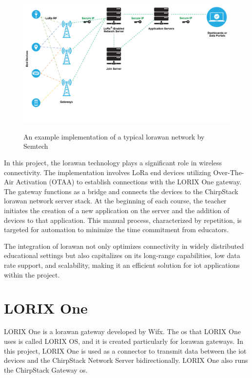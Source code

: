 \begin{figure}[ht]
  \centering
  {\includegraphics[width=\textwidth]{illustration/lorawan_network_implementation.png}}
  \caption{An example implementation of a typical \gls{lorawan} network by Semtech\cite{semtech:loRaAndLoRaWAN}}
  \label{fig:lorawan_network}
\end{figure}

In this project, the \gls{lorawan} technology plays a significant role in wireless connectivity.
The implementation involves LoRa end devices utilizing Over-The-Air Activation (OTAA) to establish connections with the LORIX One gateway.
The gateway functions as a bridge and connects the devices to the ChirpStack \gls{lorawan} network server stack.
At the beginning of each course, the teacher initiates the creation of a new application on the server and the addition of devices to that application.
This manual process, characterized by repetition, is targeted for automation to minimize the time commitment from educators.

The integration of \gls{lorawan} not only optimizes connectivity in widely distributed educational settings but also capitalizes on its long-range capabilities, low data rate support, and scalability, making it an efficient solution for \gls{iot} applications within the project.
\cite{lora-developer-portal:about}

\section{LORIX One}
LORIX One is a \gls{lorawan} gateway developed by Wifx\cite{wifx:lorixone}.
The \gls{os} that LORIX One uses is called LORIX OS, and it is created particularly for \gls{lorawan} gateways.
In this project, LORIX One is used as a connector to transmit data between the \gls{iot} devices and the ChirpStack Network Server bidirectionally.
LORIX One also runs the ChirpStack Gateway \gls{os}.

